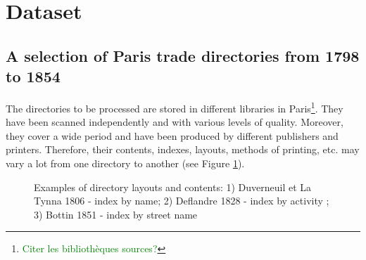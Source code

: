 \section{Dataset}
\label{sec:dataset}


\subsection{A selection of Paris trade directories from 1798 to 1854}

The directories to be processed are stored in different libraries in Paris\footnote{\textcolor{green}{Citer les bibliothèques sources?} }. They have been scanned independently and with various levels of quality. Moreover, they cover a wide period and have been produced by different publishers and printers. Therefore, their contents, indexes, layouts, methods of printing, etc. may vary a lot from one directory to another (see Figure \ref{fig:directories}).


\begin{figure}[htb!]
	  \caption{\label{fig:directories} Examples of directory layouts and contents: 1) Duverneuil et La Tynna 1806 - index by name; 2) Deflandre 1828 - index by activity ; 3) Bottin 1851 - index by street name}
\end{figure}

